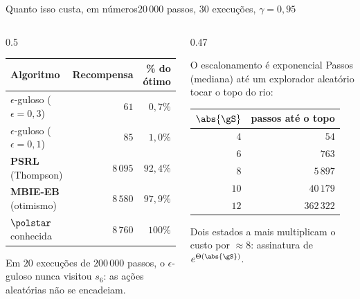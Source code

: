 \documentclass[aspectratio=169, 11pt]{beamer}
\begin{document}
\begin{frame}{Quanto isso custa, em números}{$20\,000$ passos, $30$ execuções, $\gamma = 0{,}95$}
  \begin{columns}[T]
    \begin{column}{0.5\textwidth}
      \centering\small
      \begin{tabular}{@{}lrr@{}}
        \toprule
        Algoritmo & Recompensa & \% do ótimo \\
        \midrule
        $\epsilon$-guloso ($\epsilon=0{,}3$) & $61$ & $0{,}7\%$ \\
        $\epsilon$-guloso ($\epsilon=0{,}1$) & $85$ & $1{,}0\%$ \\
        \textbf{PSRL} (Thompson)             & $8\,095$ & $92{,}4\%$ \\
        \textbf{MBIE-EB} (otimismo)          & $8\,580$ & $97{,}9\%$ \\
        \midrule
        $\polstar$ conhecida                 & $8\,760$ & $100\%$ \\
        \bottomrule
      \end{tabular}
      \vspace{0.6em}
      \begin{alertabox}
        Em $20$ execuções de $200\,000$ passos, o $\epsilon$-guloso \alert{nunca}
        visitou $s_6$: as ações aleatórias não se encadeiam.
      \end{alertabox}
    \end{column}
    \begin{column}{0.47\textwidth}
      \begin{teobox}{O escalonamento é exponencial}
        Passos (mediana) até um explorador aleatório tocar o topo do rio:
        \smallskip
        \centering\small
        \begin{tabular}{@{}rr@{}}
          \toprule
          $\abs{\gS}$ & passos até o topo \\
          \midrule
          $4$  & $54$ \\
          $6$  & $763$ \\
          $8$  & $5\,897$ \\
          $10$ & $40\,179$ \\
          $12$ & $362\,322$ \\
          \bottomrule
        \end{tabular}
      \end{teobox}
      {\scriptsize\color{rlCinza} Dois estados a mais multiplicam o custo por
      $\approx 8$: assinatura de $e^{\Theta(\abs{\gS})}$.}
    \end{column}
  \end{columns}
\end{frame}
\end{document}
